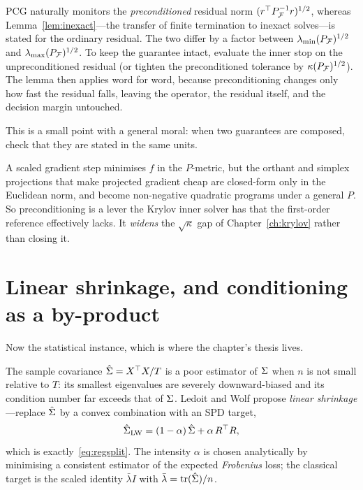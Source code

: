 \begin{remark}
PCG naturally monitors the \emph{preconditioned} residual norm
$(r^{\top} P_{\mathcal{F}}^{-1}r)^{1/2}$, whereas Lemma~\ref{lem:inexact}---the transfer of finite
termination to inexact solves---is stated for the ordinary residual. The two differ by
a factor between $\lambda_{\min}(P_{\mathcal{F}})^{1/2}$ and $\lambda_{\max}(P_{\mathcal{F}})^{1/2}$.
To keep the guarantee intact, evaluate the inner stop on the unpreconditioned residual
(or tighten the preconditioned tolerance by $\kappa(P_{\mathcal{F}})^{1/2}$). The lemma then
applies word for word, because preconditioning changes only how fast the residual falls,
leaving the operator, the residual itself, and the decision margin untouched.

This is a small point with a general moral: when two guarantees are composed, check
that they are stated in the same units.
\end{remark}

\begin{remark}
A scaled gradient step minimises $f$ in the $P$-metric, but the orthant and simplex
projections that make projected gradient cheap are closed-form only in the Euclidean
norm, and become non-negative quadratic programs under a general $P$. So
preconditioning is a lever the Krylov inner solver has that the first-order reference
effectively lacks. It \emph{widens} the $\sqrt\kappa$ gap of
Chapter~\ref{ch:krylov} rather than closing it.
\end{remark}

\section{Linear shrinkage, and conditioning as a by-product}
\label{sec:shrinkage}

Now the statistical instance, which is where the chapter's thesis lives.

The sample covariance $\hat{\Sigma} = X^{\top} X/T$ is a poor estimator of $\Sigma$ when $n$ is
not small relative to $T$: its smallest eigenvalues are severely downward-biased and
its condition number far exceeds that of $\Sigma$. Ledoit and Wolf \cite{ledoit2004}
propose \emph{linear shrinkage}---replace $\hat{\Sigma}$ by a convex combination with an
SPD target,
\[
  \hat{\Sigma}_{\mathrm{LW}} = (1-\alpha)\,\hat{\Sigma} + \alpha\, R^{\top} R,
\]
which is exactly~\eqref{eq:regsplit}. The intensity $\alpha$ is chosen analytically by
minimising a consistent estimator of the expected \emph{Frobenius} loss; the classical
target is the scaled identity $\bar\lambda I$ with
$\bar\lambda = \operatorname{tr}(\hat{\Sigma})/n$.


